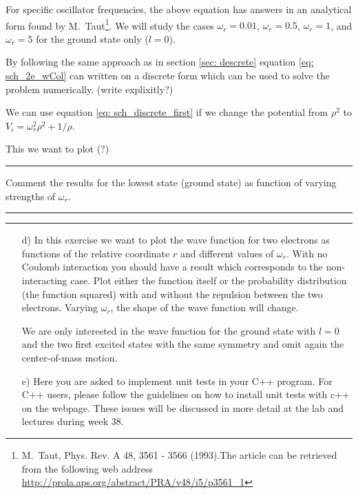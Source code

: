 \documentclass[11pt,a4wide]{article}
\begin{document}
For specific oscillator frequencies, the above equation has answers in an analytical form found by M.~Taut\footnote{M.~Taut, Phys. Rev. A 48, 3561 - 3566 (1993).The article can be retrieved from the following web address \url{http://prola.aps.org/abstract/PRA/v48/i5/p3561_1}}. We will study the cases $\omega_r = 0.01$, $\omega_r = 0.5$, $\omega_r =1$, and $\omega_r = 5$ for the ground state only ($l=0$).

By following the same approach as in section \ref{sec: descrete} equation \ref{eq: sch_2e_wCol} can written on a discrete form which can be used to solve the problem numerically. (write explixitly?)

We can use equation \ref{eq: sch_discrete_first} if we change the potential from $\rho^2$ to $V_i = \omega_r^2\rho^2+1/\rho$. 

This we want to plot (?)



\noindent\rule{\textwidth}{1pt}
Comment the results for the lowest state (ground state) as function of
varying strengths of $\omega_r$. 
\noindent\rule{\textwidth}{1pt}


\noindent\rule{\textwidth}{1pt}
\begin{enumerate}

\item[d)] 
In this exercise we want to plot the wave function for two electrons as functions of the relative coordinate $r$ and different values of $\omega_r$.  With no Coulomb interaction you should have a result which corresponds to the non-interacting case. 
Plot either the function itself or the probability distribution (the function squared) with and without the repulsion between the two electrons.
Varying $\omega_r$, the shape of the wave function
will change.  

We are only interested in the wave function for the ground state with $l=0$ and the two first excited states with the same symmetry and
omit again the center-of-mass motion.

\item[e)]  
Here you are asked to implement unit tests in your C++ program. For C++ users, please follow the guidelines on how to install unit tests with c++ on the webpage. These issues will be discussed in more detail at the lab and lectures during week 38. 


\end{enumerate}
\end{document}
